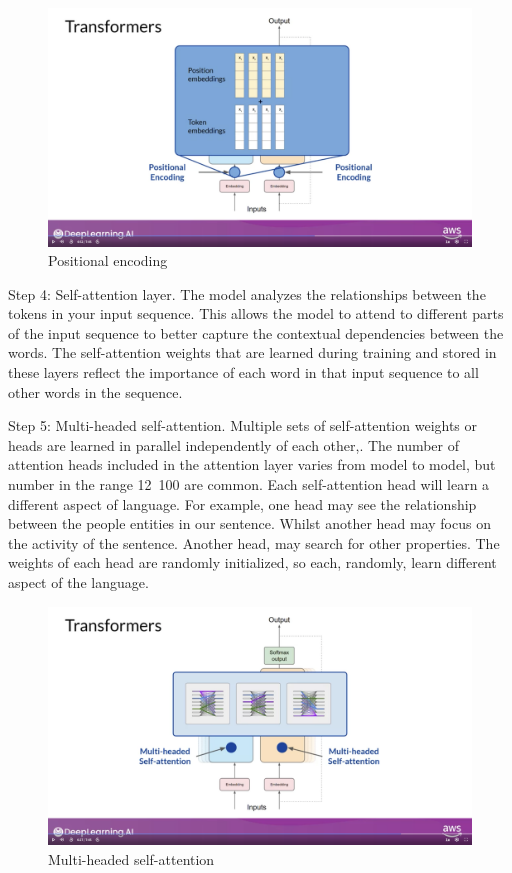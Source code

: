 \documentclass[12pt]{report}
\begin{document}
\begin{figure}[H]
  \centering
  \caption{Positional encoding}
  \includegraphics[scale=0.2]{pics/positional.png}
\end{figure}


Step 4: Self-attention layer. The model analyzes the relationships between the tokens in your input sequence. This allows the model to attend to different parts of the input sequence to better capture the contextual dependencies between the words. The self-attention weights  that are learned during training and stored in these layers reflect the importance of each word in that input sequence to all other words in the sequence.


Step 5: Multi-headed self-attention. Multiple sets of self-attention weights or heads are learned in parallel independently of each other,. The number of attention heads included in the attention layer varies from model to model, but number in the range 12~100 are common. Each self-attention head will learn a different aspect of language. For example, one head may see the relationship between the people entities in our sentence. Whilst another head may focus on the activity of the sentence. Another head, may search for other properties. The weights of each head are randomly initialized, so each, randomly, learn different aspect of the language.


\begin{figure}[H]
  \centering
  \caption{Multi-headed self-attention}
  \includegraphics[scale=0.2]{pics/multiheaded.png}
\end{figure}
\end{document}
